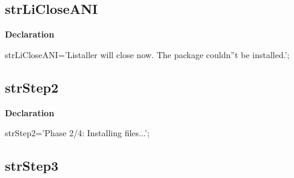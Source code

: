 \documentclass{report}
\newif\ifpdf
\begin{document}
\subsection*{strLiCloseANI}
\fi
\label{trstrings-strLiCloseANI}
\begin{list}{}{
\setlength{\itemindent}{0cm}
\setlength{\listparindent}{0cm}
\setlength{\leftmargin}{\evensidemargin}
\addtolength{\leftmargin}{\tmplength}
\settowidth{\labelsep}{X}
\addtolength{\leftmargin}{\labelsep}
\setlength{\labelwidth}{\tmplength}
}
\item[\textbf{Declaration}\hfill]
\ifpdf
\begin{flushleft}
\fi
\begin{ttfamily}
strLiCloseANI='Listaller will close now. The package couldn''t be installed.';\end{ttfamily}

\ifpdf
\end{flushleft}
\fi

\end{list}
\ifpdf
\subsection*{\large{\textbf{strStep2}}\normalsize\hspace{1ex}\hrulefill}
\else
\subsection*{strStep2}
\fi
\label{trstrings-strStep2}
\begin{list}{}{
\setlength{\itemindent}{0cm}
\setlength{\listparindent}{0cm}
\setlength{\leftmargin}{\evensidemargin}
\addtolength{\leftmargin}{\tmplength}
\settowidth{\labelsep}{X}
\addtolength{\leftmargin}{\labelsep}
\setlength{\labelwidth}{\tmplength}
}
\item[\textbf{Declaration}\hfill]
\ifpdf
\begin{flushleft}
\fi
\begin{ttfamily}
strStep2='Phase 2/4: Installing files...';\end{ttfamily}

\ifpdf
\end{flushleft}
\fi

\end{list}
\ifpdf
\subsection*{\large{\textbf{strStep3}}\normalsize\hspace{1ex}\hrulefill}
\else
\end{document}
